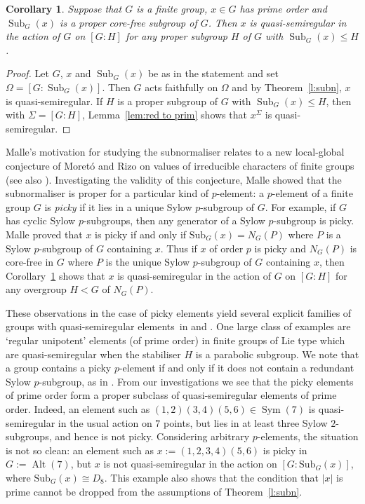 \documentclass{article}
\newtheorem{cor}[thm]{Corollary}
\theoremstyle{remark}
\theoremstyle{definition}
\DeclareMathOperator{\Alt}{Alt}
\DeclareMathOperator{\Sym}{Sym}
\DeclareMathOperator{\Sub}{Sub}
\newcommand{\qsr}{quasi-semiregular}
\newcommand{\qsres}{quasi-semiregular elements}
\begin{document}
{\begin{cor}\label{c:subn}
    Suppose that $G$ is a finite group, $x\in G$ has prime order and $\Sub_G(x)$ is a proper core-free subgroup of $G$. Then $x$ is {\qsr} in the action of $G$ on $[G:H]$ for any proper subgroup $H$ of $G$ with $\Sub_G(x) \leqslant H $.
\end{cor}

\begin{proof}
    Let $G$, $x$ and $\Sub_G(x)$ be as in the statement and set $\Omega=[G:\Sub_G(x)]$. Then $G$ acts faithfully on $\Omega$ and by Theorem~\ref{l:subn}, $x$ is {\qsr}. If $H$ is a proper subgroup of $G$ with $\Sub_G(x) \leqslant H$, then with $\Sigma=[G:H]$, Lemma~\ref{lem:red to prim} shows that $x^{\Sigma}$ is {\qsr}.
\end{proof}


Malle's motivation for studying the subnormaliser relates to  a new local-global conjecture of Moret\'{o} and Rizo on values of  irreducible characters of finite groups \cite{MoretoRizo} (see also \cite{MoretoNavarroRizo}). Investigating the validity of this conjecture, Malle showed that the subnormaliser is proper for a particular kind of $p$-element:  a $p$-element of a finite group $G$ is \emph{picky} if it lies in a unique Sylow $p$-subgroup of $G$. For example, if $G$ has cyclic Sylow $p$-subgroups, then any generator of a Sylow $p$-subgroup is picky. Malle  \cite[Corollary 2.7]{Malle} proved that $x$ is picky if and only if $\mathrm{Sub}_G(x)=N_G(P)$ where $P$ is a Sylow $p$-subgroup of $G$ containing $x$. Thus if $x$ of order $p$ is picky and $N_G(P)$ is core-free in $G$ where $P$ is the unique Sylow $p$-subgroup of $G$ containing $x$, 
then Corollary~\ref{c:subn} shows that $x$ is {\qsr} in the action of $G$ on $[G:H]$ for any overgroup $H <G$ of $N_G(P)$.
}

These observations in the case of picky elements yield several explicit families of groups with \qsres\ in \cite[Section 3]{Malle} and \cite[Section 5]{Malle}. One large class of examples are  `regular unipotent' elements (of prime order) in finite groups of Lie type which are {\qsr} when the stabiliser $H$ is a parabolic subgroup. We note that a group contains a picky $p$-element if and only if it does not contain a redundant Sylow $p$-subgroup, as in \cite{MarotiMartinezMoreto}. From our investigations we see that the picky elements {  of prime order} form a proper subclass of {\qsres} of prime order. Indeed, an element such as $(1,2)(3,4)(5,6)\in\Sym(7)$ is {\qsr} in the usual action on $7$ points, but lies in at least three Sylow $2$-subgroups, and hence is not picky. {  Considering arbitrary $p$-elements, the situation is not so clean: an element such as $x:=(1,2,3,4)(5,6)$ is picky in $G:=\Alt(7)$, but $x$ is not {\qsr} in the action on $[G:\mathrm{Sub}_G(x)]$, where $ \mathrm{Sub}_G(x)\cong D_8$. This example also shows that the condition that $|x|$ is prime cannot be dropped from the assumptions of Theorem~\ref{l:subn}.}
\end{document}
